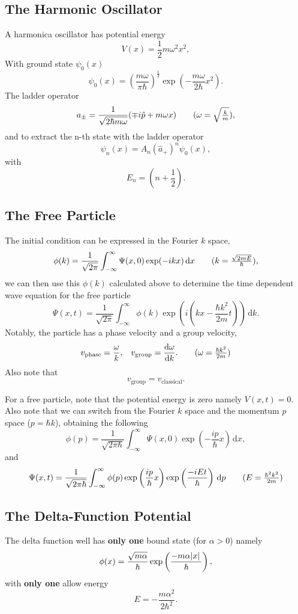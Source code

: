 \documentclass[a4paper]{article}
\newcommand{\dmr}[1]{\, \mathrm{d}#1} %
\begin{document}
\subsection{The Harmonic Oscillator}
\par A harmonica oscillator has potential energy
\begin{equation*}
    V(x) = \frac12 m \omega^2 x^2,
\end{equation*}
With ground state $\psi_{0}(x)$ 
\[
    \psi_0(x)=\left(\frac{m \omega}{\pi \hbar}\right)^{\frac{1}{4}}\exp\left(-\frac{m \omega}{2\hbar}x^2\right).
\]
The ladder operator
\[
    a_{\pm}=\frac{1}{\sqrt{2\hbar m \omega}}(\mp i \hat{p}+m\omega x)\tag{$\omega = \sqrt{\frac{k}{m}}$},
\]
and to extract the n-th state with the ladder operator
\[
    \psi_{n}(x)=A_n(\hat{a}_{+})^{n}\psi_{0}(x),
\]
with 
\[
    E_{n} = \left(n+\frac12\right).   
\]
\subsection{The Free Particle}
The initial condition can be expressed in the Fourier $k$ space,
\[
    \phi(k)=\frac{1}{\sqrt{2\pi}}\int_{-\infty}^{\infty}\Psi(x,0)\exp(-ikx)\dmr{x} \tag{\(k = \frac{\sqrt{2mE}}{\hbar}\)},
\]
we can then use this $\phi(k)$ calculated above to determine the time dependent wave equation for the free particle
\[
    \Psi(x,t)=\frac{1}{\sqrt{2\pi}}\int_{-\infty}^{\infty}\phi(k)\exp\left(i\left(kx-\frac{\hbar k^2}{2m}t\right)\right)\dmr{k}.
\]
Notably, the particle has a phase velocity and a group velocity,
\begin{align*}
    v_{\text{phase}}=\frac{\omega}{k}, && v_{\text{group}}=\dv{\omega}{k}.\tag{$\omega = \frac{\hbar k^2}{2m}$}
\end{align*}
Also note that 
\[
    v_{\text{group}} = v_{\text{classical}}.
\]

\par For a free particle, note that the potential energy is zero namely \(V(x,t)=0\). Also note that we can switch from the Fourier $k$ space and the momentum $p$ space (\(p = \hbar k\)), obtaining the following
\[
    \phi(p) = \frac{1}{\sqrt{2\pi\hbar}}\int_{-\infty}^{\infty}\Psi(x,0)\exp(-\frac{ip}{\hbar}x)\dmr{x},
\]
and
\[
    \Psi(x,t) = \frac{1}{\sqrt{2 \pi\hbar }}\int_{-\infty}^{\infty} \phi(p) \exp \left(\frac{ip}{\hbar}x\right)\exp\left(\frac{-i E t}{\hbar}\right) \dmr{p}\tag{$E = \frac{\hbar^2k^2}{2m}$}
\]  

\subsection{The Delta-Function Potential}
\par The delta function well has \textbf{only one} bound state (for $\alpha > 0$) namely
\[
    \phi(x) = \frac{\sqrt{m\alpha}}{\hbar}\exp\left(\frac{-m\alpha\abs*{x}}{\hbar}\right),    
\]
with \textbf{only one} allow energy
\[
    E = -\frac{m\alpha^2}{2\hbar^2}.
\]
\end{document}
